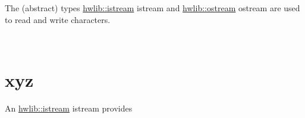 The (abstract) types \hyperlink{classhwlib_1_1istream}{hwlib\+::istream} istream and \hyperlink{classhwlib_1_1ostream}{hwlib\+::ostream} ostream are used to read and write characters.

~\newline
 

\hypertarget{timing_xyz}{}\section{xyz}\label{timing_xyz}
An \hyperlink{classhwlib_1_1istream}{hwlib\+::istream} istream provides

~\newline
 